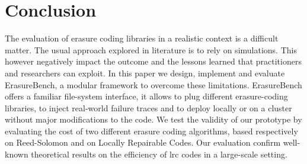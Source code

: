 \section{Conclusion}
\label{sec:conclusion}
The evaluation of erasure coding libraries in a realistic context is a difficult matter.
The usual approach explored in literature is to rely on simulations.
This however negatively impact the outcome and the lessons learned that practitioners and researchers can exploit. 
In this paper we design, implement and evaluate ErasureBench, a modular framework to overcome these limitations.
ErasureBench offers a familiar file-system interface, it allows to plug different erasure-coding libraries, to inject real-world failure traces and to deploy locally or on a cluster without major modifications to the code.
We test the validity of our prototype by evaluating the cost of two different erasure coding algorithms, based respectively on Reed-Solomon and on Locally Repairable Codes.
Our evaluation confirm well-known theoretical results on the efficiency of \ac{lrc} codes in a large-scale setting.  


